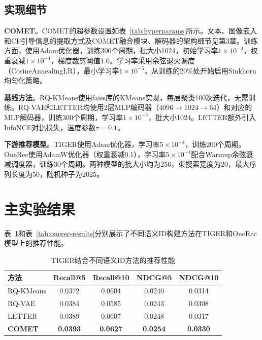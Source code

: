 \subsection{实现细节}

\textbf{COMET}。COMET的超参数设置如表~\ref{tab:hyperparams}所示。文本、图像嵌入和CF引导信息的提取方式及COMET融合模块、解码器的架构细节见第3章。训练方面，使用Adam优化器，训练300个周期，批大小1024，初始学习率$1 \times 10^{-3}$，权重衰减$1 \times 10^{-4}$，梯度裁剪阈值1.0。学习率采用余弦退火调度（CosineAnnealingLR），最小学习率$1 \times 10^{-5}$。从训练的20\%处开始启用Sinkhorn均匀化策略。

\textbf{基线方法}。RQ-KMeans使用faiss库的KMeans实现，每层聚类100次迭代，无需训练。RQ-VAE和LETTER均使用2层MLP编码器（$4096 \to 1024 \to 64$）和对应的MLP解码器，训练300个周期，学习率$1 \times 10^{-3}$，批大小1024。LETTER额外引入InfoNCE对比损失，温度参数$\tau = 0.1$。

\textbf{下游推荐模型}。TIGER使用Adam优化器，学习率$5 \times 10^{-4}$，训练200个周期。OneRec使用AdamW优化器（权重衰减0.1），学习率$5 \times 10^{-4}$配合Warmup余弦衰减调度器，训练30个周期。两种模型的批大小均为256，束搜索宽度为20，最大序列长度为50，随机种子为2025。

\section{主实验结果}

表~\ref{tab:tiger-results}和表~\ref{tab:onerec-results}分别展示了不同语义ID构建方法在TIGER和OneRec模型上的推荐性能。

\begin{table}[htbp]
  \centering
  \caption{TIGER结合不同语义ID方法的推荐性能}
  \label{tab:tiger-results}
  \begin{tabular}{lcccc}
    \toprule
    方法 & Recall@5 & Recall@10 & NDCG@5 & NDCG@10 \\
    \midrule
    RQ-KMeans\cite{onerec} & 0.0372 & 0.0604 & 0.0240 & 0.0314 \\
    RQ-VAE\cite{lee2022autoregressive} & 0.0384 & 0.0585 & 0.0243 & 0.0308 \\
    LETTER\cite{wang2024learnable} & 0.0389 & 0.0607 & 0.0248 & 0.0317 \\
    \textbf{COMET} & \textbf{0.0393} & \textbf{0.0627} & \textbf{0.0254} & \textbf{0.0330} \\
    \bottomrule
  \end{tabular}

\end{table}

